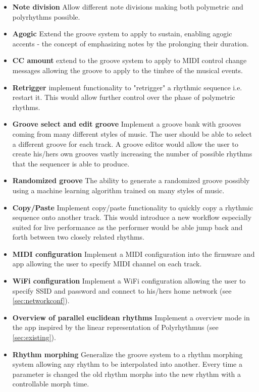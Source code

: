 %
\begin{itemize}
    \item \textbf{Note division} Allow different  note divisions making both polymetric and polyrhythms possible.
    \item \textbf{Agogic} Extend the groove system to apply to sustain, enabling agogic accents - the concept of emphasizing notes by the prolonging their duration. 
    \item \textbf{CC amount} extend to the groove system to apply to MIDI control change messages allowing the groove to apply to the timbre of the musical events.
    \item \textbf{Retrigger} implement functionality to "retrigger" a rhythmic sequence i.e. restart it. This would allow further control over the phase of polymetric rhythms.
    \item \textbf{Groove select and edit groove} Implement a groove bank with grooves coming from many different styles of music. The user should be able to select a different groove for each track. A groove editor would allow the user to create his/hers own grooves vastly increasing the number of possible rhythms that the sequencer is able to produce.
    \item \textbf{Randomized groove} The ability to generate a randomized groove possibly using a machine learning algorithm trained on many styles of music.   
    \item \textbf{Copy/Paste} Implement copy/paste functionality to quickly copy a rhythmic sequence onto another track. This would introduce a new workflow especially suited for live performance as the performer would be able jump back and forth between two closely related rhythms.  
    \item \textbf{MIDI configuration} Implement a MIDI configuration into the firmware and app allowing the user to specify MIDI channel on each track.
    \item \textbf{WiFi configuration} Implement a WiFi configuration allowing the user to specify SSID and password and connect to his/hers home network (see \cref{sec:networkconf}). 
    \item \textbf{Overview of parallel euclidean rhythms} Implement a overview mode in the app inspired by the linear representation of Polyrhythmus (see \cref{sec:existing}).
    \item \textbf{Rhythm morphing} Generalize the groove system to a rhythm morphing system allowing any rhythm to be interpolated into another. Every time a parameter is changed the old rhythm morphs into the new rhythm with a controllable morph time. 

\end{itemize}
